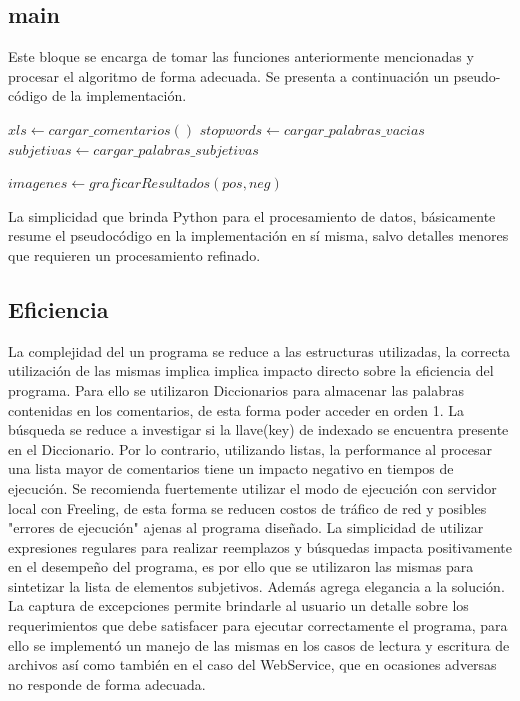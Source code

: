 \documentclass[12pt]{article}
\begin{document}
\subsection{main}
Este bloque se encarga de tomar las funciones anteriormente mencionadas y procesar el algoritmo de forma adecuada.
Se presenta a continuación un pseudo-código de la implementación.

\begin{algorithmic}
  \State $xls \gets cargar\_comentarios()$
  \State $stopwords \gets cargar\_palabras\_vacias$
  \State $subjetivas \gets cargar\_palabras\_subjetivas$
  
     \EndFor
  \EndFor
  
  \State $imagenes \gets graficarResultados(pos, neg)$
\end{algorithmic}
La simplicidad que brinda Python para el procesamiento de datos, básicamente resume el pseudocódigo en la implementación en sí misma, salvo detalles menores que requieren un procesamiento refinado.


\subsection{Eficiencia}
La complejidad del un programa se reduce a las estructuras utilizadas, la correcta utilización de las mismas implica implica impacto directo sobre la eficiencia del programa. Para ello se utilizaron Diccionarios para almacenar las palabras contenidas en los comentarios, de esta forma poder acceder en orden 1. La búsqueda se reduce a investigar si la llave(key) de indexado se encuentra presente en el Diccionario. Por lo contrario, utilizando listas, la performance al procesar una lista mayor de comentarios tiene un impacto negativo en tiempos de ejecución.
Se recomienda fuertemente utilizar el modo de ejecución con servidor local con Freeling, de esta forma se reducen costos de tráfico de red y posibles "errores de ejecución" ajenas al programa diseñado.
La simplicidad de utilizar expresiones regulares para realizar reemplazos y búsquedas impacta positivamente en el desempeño del programa, es por ello que se utilizaron las mismas para sintetizar la lista de elementos subjetivos. Además agrega elegancia a la solución.
La captura de excepciones permite brindarle al usuario un detalle sobre los requerimientos que debe satisfacer para ejecutar correctamente el programa, para ello se implementó un manejo de las mismas en los casos de lectura y escritura de archivos así como también en el caso del WebService, que en ocasiones adversas no responde de forma adecuada.
\end{document}
